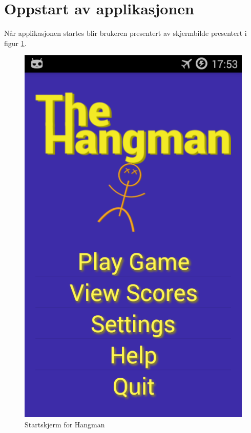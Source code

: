 \section{Oppstart av applikasjonen}
Når applikasjonen startes blir brukeren presentert av skjermbilde presentert i figur \ref{fig:activity_front}. 
\begin{figure}[ht]
\centering
 \includegraphics[scale=0.25]{./img/bruksanvisning/1.png}
 \caption{Startskjerm for Hangman}
 \label{fig:activity_front}
\end{figure}


